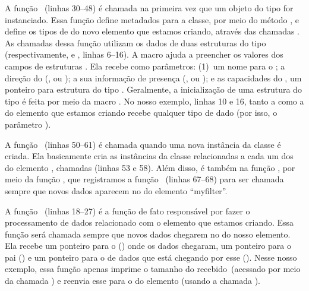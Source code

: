 A função ~(linhas 30--48) é chamada na primeira vez
que um objeto do tipo  for instanciado.  Essa função define
metadados para a classe, por meio do método ,
e define os tipos de  do novo elemento que estamos criando, através
das chamadas .  As chamadas dessa função
utilizam os dados de duas estruturas do tipo 
(respectivamente,  e , linhas 6--16).  A macro
 ajuda a preencher os valores dos campos de
estruturas .  Ela recebe como parâmetros: (1)~um nome
para o ; a direção do  (,
 ou ); a sua informação de presença
(,  ou ); e as
capacidades do , um ponteiro para estrutura do tipo .
Geralmente, a inicialização de uma estrutura do tipo  é feita por
meio da macro .  No nosso exemplo, linhas 10 e 16, tanto a
 como a  do elemento que estamos criando recebe
qualquer tipo de dado (por isso, o parâmetro ).

A função ~(linhas 50--61) é chamada quando uma nova
instância da classe  é criada.  Ela basicamente cria as
instâncias da classe  relacionadas a cada um dos  do
elemento , chamadas  (linhas
53 e 58).  Além disso, é também na função , por meio da
função , que registramos a função
~(linhas 67--68)  para ser chamada sempre que novos
dados aparecem no  do elemento ``myfilter''.

A função ~(linhas 18--27) é a função de fato responsável
por fazer o processamento de dados relacionado com o elemento que estamos
criando.  Essa função será chamada sempre que novos dados chegarem no
 do nosso elemento.  Ela recebe um ponteiro para o 
() onde os dados chegaram, um ponteiro para o pai () e
um ponteiro para o  de dados que está chegando por esse 
().  Nesse nosso exemplo, essa função apenas imprime o tamanho
do  recebido~(acessado por meio da chamada
) e reenvia esse  para o  do
elemento (usando a chamada ).

